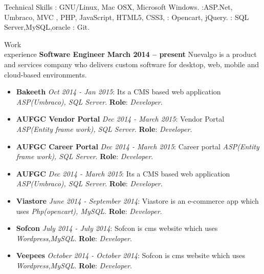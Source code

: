 \documentclass{resume}
\author{Babin Babu}
\begin{document}
\maketitle





\begin{category}{Technical Skills}
  : GNU/Linux, Mac OSX, Microsoft Windows.
  :ASP.Net, Umbraco, MVC , PHP, JavaScript, HTML5, CSS3,
  : Opencart, jQuery.
  : SQL Server,MySQL,oracle
  : Git.
\end{category}


\begin{category}{Work \\experience}
  \citemnobullet \textbf{Software Engineer} \hfill \textbf{March 2014 -- present}
  \citemnobullet Nuevalgo is a product and services company who delivers custom software for desktop, web, mobile and cloud-based environments.
  \begin{itemize}
  \item \textbf{Bakeeth} {\em Oct 2014 - Jan 2015}: Its a CMS based web application {\em ASP(Umbraco),  SQL Server}. \textbf{Role}: {\em Developer}.  
  \item \textbf{AUFGC Vendor Portal} {\em Dec 2014 - March 2015}: Vendor Portal {\em ASP(Entity frame work),  SQL Server}. \textbf{Role}: {\em Developer}.  
  \item \textbf{AUFGC Career Portal} {\em Dec 2014 - March 2015}: Career portal {\em ASP(Entity frame work),  SQL Server}. \textbf{Role}: {\em Developer}.  
  \item \textbf{AUFGC} {\em Dec 2014 - March 2015}: Its a CMS based web application {\em ASP(Umbraco),  SQL Server}. \textbf{Role}: {\em Developer}.  
  \item \textbf{Viastore} {\em June 2014 - September 2014}: Viastore is an e-commerce app which uses {\em Php(opencart),  MySQL}. \textbf{Role}: {\em Developer}.  
  \item \textbf{Sofcon} {\em July 2014 - July 2014}: Sofcon is cms website which uses {\em Wordpress,MySQL}. \textbf{Role}: {\em Developer}.
  \item \textbf{Veepees} {\em October 2014 - October 2014}: Sofcon is cms website which uses {\em Wordpress,MySQL}. \textbf{Role}: {\em Developer}.
  \end{itemize}
  \end{category}
\end{document}
